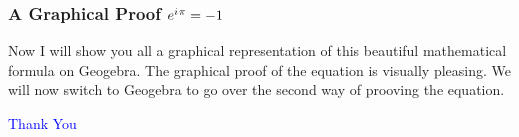 \documentclass[10pt]{beamer}
\newcommand{\iu}{{i\mkern1mu}}
\begin{document}
\begin{frame}
	\frametitle{A Graphical Proof \hspace{25pt} \textcolor{pink}{\Huge\(e^{\iu \pi} = -1\)}}
	
	Now I will show you all a graphical representation of this beautiful mathematical formula on Geogebra. The graphical proof of the equation is visually pleasing. We will now switch to Geogebra to go over the second way of prooving the equation.
\end{frame}

\begin{frame}
	\begin{center}
		\Huge \textcolor{blue}{Thank You} \\
		\vspace{25pt}
	\end{center}
\end{frame}
\end{document}

